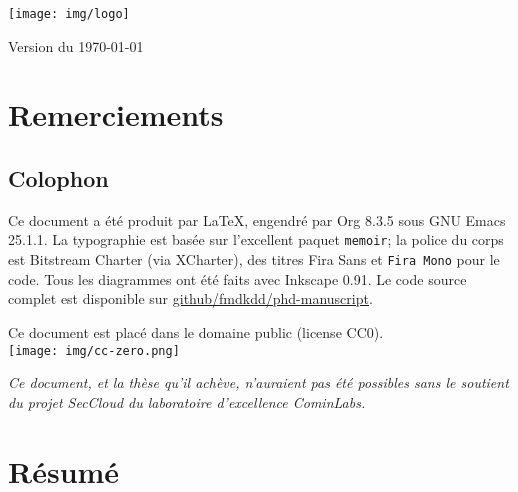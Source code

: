 \vspace{3cm}
\begin{flushright}
{\large\theauthor}
\end{flushright}

\vfill
\begin{center}
\texttt{[image: img/logo]}
\end{center}

\vfill
\begin{center}
Version \versiontag{} du \today
\end{center}

\cleardoublepage
\section*{Remerciements}


\cleartoverso
\phantom{a}                     %
\vfill
\begin{minipage}{26pc}
\subsection*{Colophon}
Ce document a été produit par \LaTeX{}, engendré par Org 8.3.5 sous GNU Emacs
25.1.1.  La typographie est basée sur l'excellent paquet \texttt{memoir}; la
police du corps est Bitstream Charter (via XCharter), des titres \textsf{Fira
Sans} et \texttt{Fira Mono} pour le code.  Tous les diagrammes ont été faits
avec Inkscape 0.91.  Le code source complet est disponible sur
\href{https://github.com/fmdkdd/phd-manuscript}{github/fmdkdd/phd-manuscript}.

\vfill
\begin{center}
Ce document est placé dans le domaine public (license CC0).\\
\vspace{4pt}
\texttt{[image: img/cc-zero.png]}
\end{center}
\end{minipage}

\cleartorecto
\begin{minipage}{26pc}
\itshape Ce document, et la thèse qu'il achève, n'auraient pas été possibles
sans le soutient du projet SecCloud du laboratoire d'excellence CominLabs.
\end{minipage}
\vfill
\begin{minipage}{26pc}
\section*{Résumé}

\end{minipage}
\vfill
\phantom{a}

